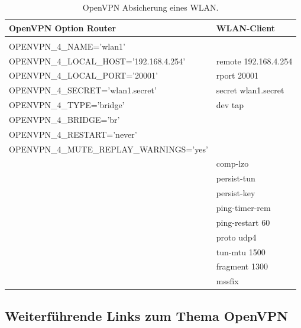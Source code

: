 \begin{table}[htbp]
  \begin{scriptsize}
    \begin{tabular}{ll}
      OpenVPN Option Router                         & WLAN-Client         \\
      \hline \\
      OPENVPN\_4\_NAME='wlan1'                      & ~ \\
      OPENVPN\_4\_LOCAL\_HOST='192.168.4.254'       & remote 192.168.4.254\\
      OPENVPN\_4\_LOCAL\_PORT='20001'               & rport 20001 \\
      OPENVPN\_4\_SECRET='wlan1.secret'             & secret wlan1.secret \\
      OPENVPN\_4\_TYPE='bridge'                     & dev tap\\
      OPENVPN\_4\_BRIDGE='br'                       & ~\\
      OPENVPN\_4\_RESTART='never'                   & ~\\
      OPENVPN\_4\_MUTE\_REPLAY\_WARNINGS='yes'      & ~\\
      ~                                             & comp-lzo \\
      ~                                             & persist-tun \\
      ~                                             & persist-key \\
      ~                                             & ping-timer-rem \\
      ~                                             & ping-restart 60 \\
      ~                                             & proto udp4 \\
      ~                                             & tun-mtu 1500 \\
      ~                                             & fragment 1300 \\
      ~                                             & mssfix \\
    \end{tabular}
  \end{scriptsize}
  \caption{OpenVPN Absicherung eines WLAN.}
\end{table}

\subsection{Weiterführende Links zum Thema OpenVPN}

